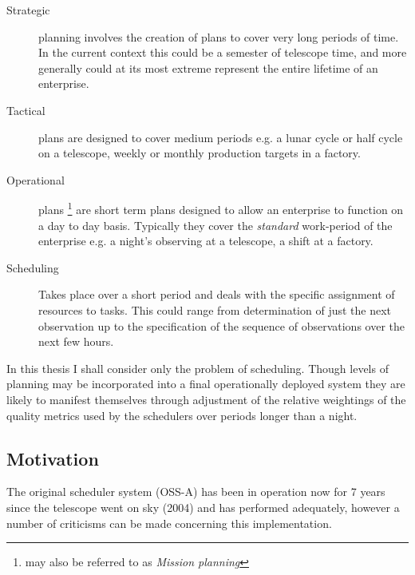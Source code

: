 \begin{description}
\item[Strategic] planning involves the creation of plans to cover very long periods of time. In the current context this could be a semester of telescope time, and more generally could at its most extreme represent the entire lifetime of an enterprise. 
\item[Tactical] plans are designed to cover medium periods e.g. a lunar cycle or half cycle on a telescope,  weekly or monthly production targets in a factory.
\item[Operational] plans \footnote{may also be referred to as \emph{Mission planning}} are short term plans designed to allow an enterprise to function on a day to day basis. Typically they cover the \emph{standard} work-period of the enterprise e.g. a night's observing at a telescope, a shift at a factory.
\item[Scheduling] Takes place over a short period and deals with the specific assignment of resources to tasks. This could range from determination of just the next observation up to the specification of the sequence of observations over the next few hours.
\end{description}

In this thesis I shall consider only the problem of scheduling. Though levels of planning may be incorporated into a final operationally deployed system they are likely to manifest themselves through adjustment of the relative weightings of the quality metrics used by the schedulers over periods longer than a night. 



\subsection{Motivation}

The original scheduler system (OSS-A) has been in operation now for 7 years since the telescope went on sky (2004) and has performed adequately, however a number of criticisms can be made concerning this implementation.

